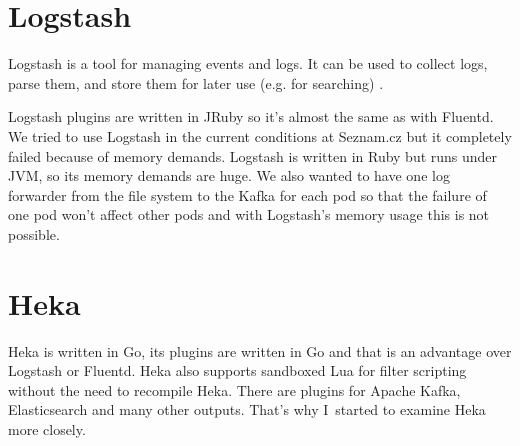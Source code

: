 \section{Logstash}
Logstash is a tool for managing events and logs. It can be used to collect logs, parse them, and store them for later use (e.g. for searching) \cite{logstash}.
 
Logstash plugins are written in JRuby so it’s almost the same as with Fluentd. We tried to use Logstash in the current conditions at Seznam.cz but it completely failed because of memory demands. Logstash is written in Ruby but runs under JVM, so its memory demands are huge. We also wanted to have one log forwarder from the file system to the Kafka for each pod so that the failure of one pod won’t affect other pods and with Logstash’s memory usage this is not possible.
    
\section{Heka}
Heka \cite{heka} is written in Go, its plugins are written in Go and that is an advantage over Logstash or Fluentd. Heka also supports sandboxed Lua for filter scripting without the need to recompile Heka. There are plugins for Apache Kafka, Elasticsearch and many other outputs. That’s why I~started to examine Heka more closely.

